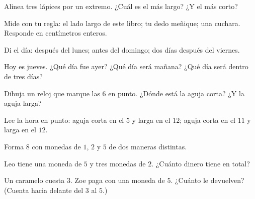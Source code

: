 \begin{exercise}[$\star$]\label{exo:g1:measure:1}
Alinea tres lápices por un extremo. ¿Cuál es el más largo?
¿Y el más corto?
\end{exercise}

\begin{exercise}[$\star$]\label{exo:g1:measure:2}
Mide con tu regla: el lado largo de este libro; tu dedo
meñique; una cuchara. Responde en centímetros enteros.
\end{exercise}

\begin{exercise}[$\star$]\label{exo:g1:measure:3}
Di el día: después del lunes; antes del domingo; dos días después del viernes.
\end{exercise}

\begin{exercise}[$\star$]\label{exo:g1:measure:4}
Hoy es jueves. ¿Qué día fue ayer? ¿Qué día será mañana?
¿Qué día será dentro de tres días?
\end{exercise}

\begin{exercise}[$\star$]\label{exo:g1:measure:5}
Dibuja un reloj que marque las $6$ en punto. ¿Dónde está la aguja corta? ¿Y
la aguja larga?
\end{exercise}

\begin{exercise}[$\star$]\label{exo:g1:measure:6}
Lee la hora en punto: aguja corta en el $5$ y larga en el $12$; aguja
corta en el $11$ y larga en el $12$.
\end{exercise}

\begin{exercise}[$\star$]\label{exo:g1:measure:7}
Forma $8$ con monedas de $1$, $2$ y $5$ de dos maneras distintas.
\end{exercise}

\begin{exercise}[$\star$]\label{exo:g1:measure:8}
Leo tiene una moneda de $5$ y tres monedas de $2$. ¿Cuánto dinero tiene
en total?
\end{exercise}

\begin{exercise}[$\star\star$]\label{exo:g1:measure:9}
Un caramelo cuesta $3$. Zoe paga con una moneda de $5$. ¿Cuánto le
devuelven? (Cuenta hacia delante del $3$ al $5$.)
\end{exercise}
